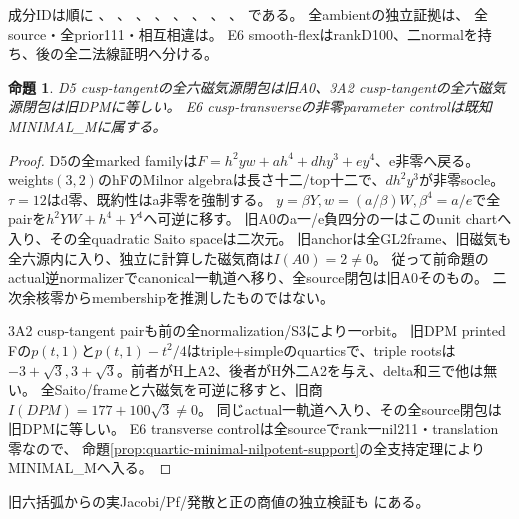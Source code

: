 \documentclass[a4paper,11pt]{ltjsarticle}
\newtheorem{proposition}{命題}[section]
\theoremstyle{definition}
\begin{document}
成分IDは順に
、
、
、
、
、
、
、
、
である。
全ambientの独立証拠は、
全source・全prior111・相互相違は。
E6 smooth-flexはrankD100、二normalを持ち、後の全二法線証明へ分ける。

\begin{proposition}\label{prop:marked-quartic-A0-DPM-positive}
D5 cusp-tangentの全六磁気源閉包は旧A0、3A2 cusp-tangentの全六磁気源閉包は旧DPMに等しい。
E6 cusp-transverseの非零parameter controlは既知MINIMAL\_Mに属する。
\end{proposition}
\begin{proof}
D5の全marked familyは$F=h^2yw+ah^4+dhy^3+ey^4$、e非零へ戻る。
weights$(3,2)$のhFのMilnor algebraは長さ十二/top十二で、$dh^2y^3$が非零socle。
$\tau=12$はd零、既約性はa非零を強制する。
$y=\beta Y,w=(a/\beta)W,\beta^4=a/e$で全pairを$h^2YW+h^4+Y^4$へ可逆に移す。
旧A0のa一/e負四分の一はこのunit chartへ入り、その全quadratic Saito spaceは二次元。
旧anchorは全GL2frame、旧磁気も全六源内に入り、独立に計算した磁気商は$I(A0)=2\ne0$。
従って前命題のactual逆normalizerでcanonical一軌道へ移り、全source閉包は旧A0そのもの。
二次余核零からmembershipを推測したものではない。

3A2 cusp-tangent pairも前の全normalization/S3により一orbit。
旧DPM printed Fの$p(t,1)$と$p(t,1)-t^2/4$はtriple+simpleのquarticsで、triple rootsは
$-3+\sqrt3,3+\sqrt3$。前者がH上A2、後者がH外二A2を与え、delta和三で他は無い。
全Saito/frameと六磁気を可逆に移すと、旧商$I(DPM)=177+100\sqrt3\ne0$。
同じactual一軌道へ入り、その全source閉包は旧DPMに等しい。
E6 transverse controlは全sourceでrank一nil211・translation零なので、
命題\ref{prop:quartic-minimal-nilpotent-support}の全支持定理によりMINIMAL\_Mへ入る。
\end{proof}
旧六括弧からの実Jacobi/Pf/発散と正の商値の独立検証も
にある。
\end{document}

